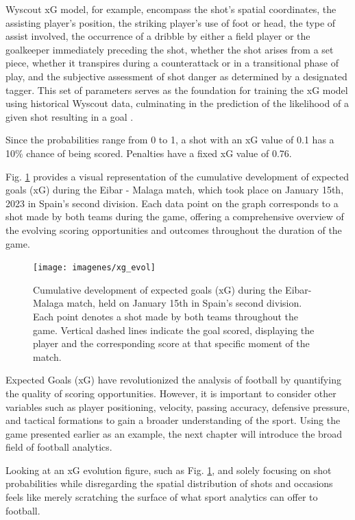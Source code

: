 \documentclass[
  10pt,
  twoside,nohyper]{book}
\begin{document}
Wyscout xG model, for example, encompass the shot's spatial coordinates, the assisting player's position, the striking player's use of foot or head, the type of assist involved, the occurrence of a dribble by either a field player or the goalkeeper immediately preceding the shot, whether the shot arises from a set piece, whether it transpires during a counterattack or in a transitional phase of play, and the subjective assessment of shot danger as determined by a designated tagger. This set of parameters serves as the foundation for training the xG model using historical Wyscout data, culminating in the prediction of the likelihood of a given shot resulting in a goal \autocite{wyscout}.

Since the probabilities range from 0 to 1, a shot with an xG value of
0.1 has a 10\% chance of being scored. Penalties have a fixed xG value of 0.76.

Fig. \ref{fig:xg} provides a visual representation of the cumulative development of expected goals
(xG) during the Eibar - Malaga match, which took place on January 15th, 2023 in Spain's second division. Each data point on the graph
corresponds to a shot made by both teams during the game,
offering a comprehensive overview of the evolving scoring opportunities and outcomes throughout the duration of the game.

\begin{figure}[H]

{\centering \texttt{[image: imagenes/xg\_evol]} 

}

\caption{Cumulative development of expected goals (xG) during the Eibar-Malaga match, held on January 15th in Spain’s second division. Each point denotes a shot made by both teams throughout the game. Vertical dashed lines indicate the goal scored, displaying the player and the corresponding score at that specific moment of the match.}\label{fig:xg}
\end{figure}

Expected Goals (xG) have revolutionized the analysis of football by quantifying the quality of scoring opportunities. However, it is important to consider other variables such as player positioning, velocity, passing accuracy, defensive pressure, and tactical formations to gain a broader understanding of the sport. Using the game presented earlier as an example, the next chapter will introduce the broad field of football analytics.

Looking at an xG evolution figure, such as Fig. \ref{fig:xg}, and solely focusing on shot probabilities while disregarding the spatial distribution of shots and occasions feels like merely scratching the surface of what sport analytics can offer to football.
\end{document}
